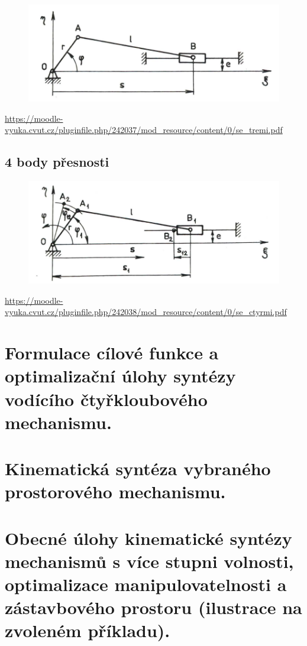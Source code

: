 \documentclass{article}
\begin{document}
	\begin{figure}[h!]
		\centering
		\includegraphics{figs/KlikovyMechanismus.png}
	\end{figure}

	\url{https://moodle-vyuka.cvut.cz/pluginfile.php/242037/mod_resource/content/0/se_tremi.pdf}

	\subsection*{4 body přesnosti}
	\begin{figure}[h!]
		\centering
		\includegraphics{figs/KlikovyMechanismus4.png}
	\end{figure}

	\url{https://moodle-vyuka.cvut.cz/pluginfile.php/242038/mod_resource/content/0/se_ctyrmi.pdf}

	\section{Formulace cílové funkce a optimalizační úlohy syntézy vodícího čtyřkloubového mechanismu.}

	\section{Kinematická syntéza vybraného prostorového mechanismu.}

	\section{Obecné úlohy kinematické syntézy mechanismů s více stupni volnosti, optimalizace manipulovatelnosti a zástavbového prostoru (ilustrace na zvoleném příkladu).}
\end{document}
